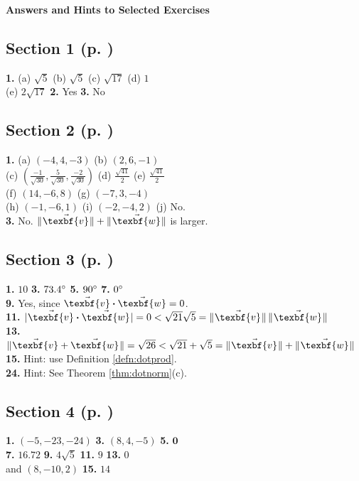 \textsf{\textbf{\Large Answers and Hints to Selected Exercises}}
\begin{multicols}{2}

\subsection*{Section 1 (p. \pageref{ssec1dot1})}
\textbf{1.} (a) $\sqrt{5}$ \quad (b) $\sqrt{5}$ \quad (c) $\sqrt{17}$ \quad (d) $1$\\(e) $2 \sqrt{17}$ \quad \textbf{2.}
Yes \quad \textbf{3.} No
\subsection*{Section 2 (p. \pageref{ssec1dot2})}
\textbf{1.} (a) $(-4,4,-3)$ \quad (b) $(2,6,-1)$\\(c) $\left ( \frac{-1}{\sqrt{30}},\frac{5}{\sqrt{30}},
\frac{-2}{\sqrt{30}}\right )$ \quad (d) $\frac{\sqrt{41}}{2}$ \quad (e) $\frac{\sqrt{41}}{2}$\\(f) $(14,-6,8)$ \quad
(g) $(-7,3,-4)$\\(h) $(-1,-6,1)$ \quad (i) $(-2,-4,2)$ \quad (j) No.\\\textbf{3.} No. $\norm{\vec{\texbf{v}}} +
\norm{\vec{\texbf{w}}}$ is larger.
\subsection*{Section 3 (p. \pageref{ssec1dot3})}
\textbf{1.} $10$ \quad \textbf{3.} $73.4^\circ$ \quad \textbf{5.} $90^\circ$ \quad \textbf{7.} $0^\circ$\\
\textbf{9.} Yes, since $\Dotprod{\vec{\texbf{v}}}{\vec{\texbf{w}}} = 0$.\\\textbf{11.} $\abs{\Dotprod{\vec{\texbf{v}}}{\vec{\texbf{w}}}} =
0 < \sqrt{21}\sqrt{5} = \norm{\vec{\texbf{v}}}\,\norm{\vec{\texbf{w}}}$\\\textbf{13.} $\norm{\vec{\texbf{v}} + \vec{\texbf{w}}} = \sqrt{26}
< \sqrt{21} + \sqrt{5} = \norm{\vec{\texbf{v}}} + \norm{\vec{\texbf{w}}}$\\\textbf{15.} Hint: use Definition
\ref{defn:dotprod}.\\
\textbf{24.} Hint: See Theorem \ref{thm:dotnorm}(c).
\subsection*{Section 4 (p. \pageref{ssec1dot4})}
\textbf{1.} $(-5,-23,-24)$ \quad \textbf{3.} $(8,4,-5)$ \quad \textbf{5.} $\textbf{0}$\\\textbf{7.} $16.72$ \quad
\textbf{9.} $4\sqrt{5}$ \quad \textbf{11.} $9$ \quad \textbf{13.} $0$\\and $(8,-10,2)$ \quad \textbf{15.} $14$

\end{multicols}
